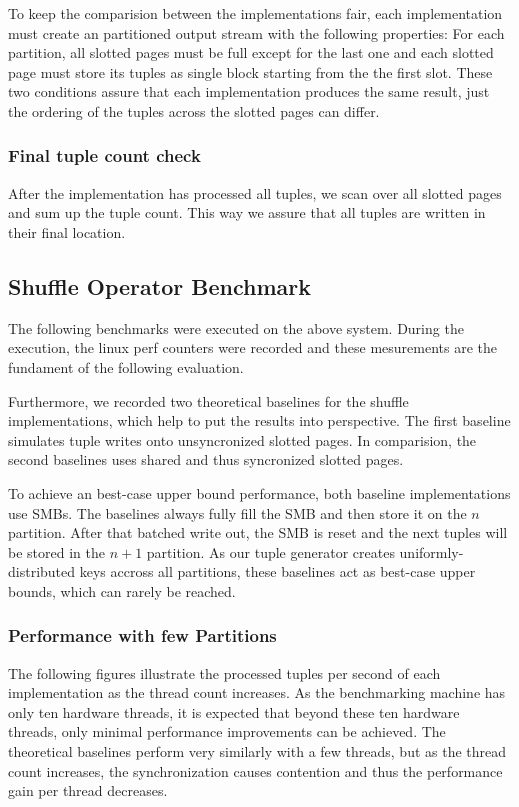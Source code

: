 To keep the comparision between the implementations fair, each implementation must create an partitioned output stream with the following properties: For each partition, all slotted pages must be full except for the last one and each slotted page must store its tuples as single block starting from the the first slot.
These two conditions assure that each implementation produces the same result, just the ordering of the tuples across the slotted pages can differ.
\subsubsection{Final tuple count check}
After the implementation has processed all tuples, we scan over all slotted pages and sum up the tuple count.
This way we assure that all tuples are written in their final location.

\subsection{Shuffle Operator Benchmark}
The following benchmarks were executed on the above system.
During the execution, the linux perf counters were recorded and these mesurements are the fundament of the following evaluation.

Furthermore, we recorded two theoretical baselines for the shuffle implementations, which help to put the results into perspective.
The first baseline simulates tuple writes onto unsyncronized slotted pages.
In comparision, the second baselines uses shared and thus syncronized slotted pages.

To achieve an best-case upper bound performance, both baseline implementations use \acfp{SMB}.
The baselines always fully fill the \ac{SMB} and then store it on the $n$ partition.
After that batched write out, the \ac{SMB} is reset and the next tuples will be stored in the $n+1$ partition.
As our tuple generator creates uniformly-distributed keys accross all partitions, these baselines act as best-case upper bounds, which can rarely be reached.

\subsubsection{Performance with few Partitions}
The following figures illustrate the processed tuples per second of each implementation as the thread count increases.
As the benchmarking machine has only ten hardware threads, it is expected that beyond these ten hardware threads, only minimal performance improvements can be achieved.
The theoretical baselines perform very similarly with a few threads, but as the thread count increases, the synchronization causes contention and thus the performance gain per thread decreases.

